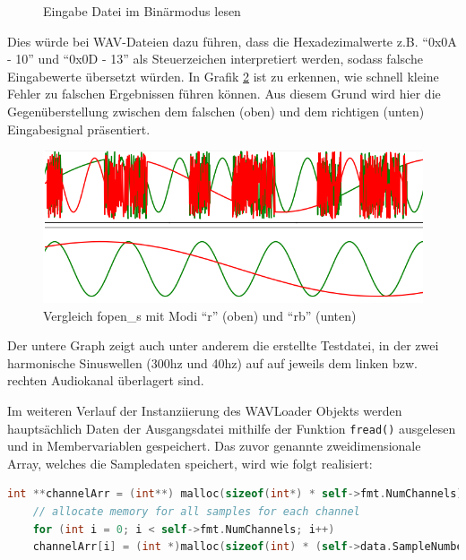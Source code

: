 \begin{figure}[t!]
	
	\caption{Eingabe Datei im Binärmodus lesen}
	\label{fig:openFile}
\end{figure}

Dies würde bei WAV-Dateien dazu führen, dass die Hexadezimalwerte z.B. \enquote{0x0A - 10} und \enquote{0x0D - 13} als Steuerzeichen interpretiert werden, sodass falsche Eingabewerte übersetzt würden. In Grafik \ref{fig:differenceGraph} ist zu erkennen, wie schnell kleine Fehler zu falschen Ergebnissen führen können. Aus diesem Grund wird hier die Gegenüberstellung zwischen dem falschen (oben) und dem richtigen (unten) Eingabesignal präsentiert.

\begin{figure}[hbt!]
	\centering      
	\includegraphics[scale=0.5]{figures/layerDifference.png}
	\caption{Vergleich fopen\_s mit Modi \enquote{r} (oben) und \enquote{rb} (unten)}
	\label{fig:differenceGraph}
\end{figure}

Der untere Graph zeigt auch unter anderem die erstellte Testdatei, in der zwei harmonische Sinuswellen (300hz und 40hz) auf auf jeweils dem linken bzw. rechten Audiokanal überlagert sind.

Im weiteren Verlauf der Instanziierung des WAVLoader Objekts werden hauptsächlich Daten der Ausgangsdatei mithilfe der Funktion \texttt{fread()} ausgelesen und in Membervariablen gespeichert. Das zuvor genannte zweidimensionale Array, welches die Sampledaten speichert, wird wie folgt realisiert:

\newpage
\begin{lstlisting}[language=C, frame=none]
	int **channelArr = (int**) malloc(sizeof(int*) * self->fmt.NumChannels);
	// allocate memory for all samples for each channel
	for (int i = 0; i < self->fmt.NumChannels; i++)
	channelArr[i] = (int *)malloc(sizeof(int) * (self->data.SampleNumber) + 1);
\end{lstlisting} 


